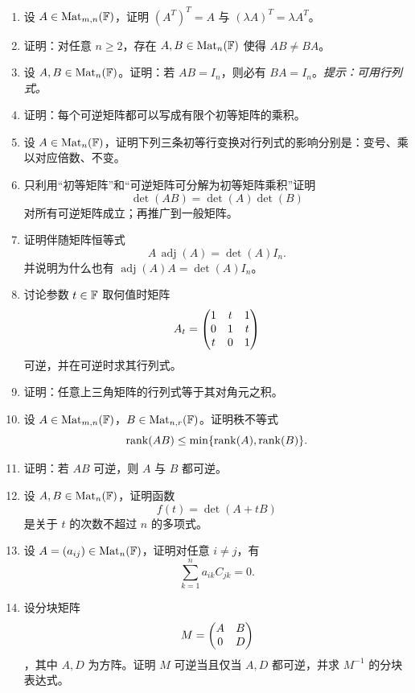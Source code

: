 \begin{enumerate}[label=\arabic*.,start=31]
  \item \medium 设 $A\in\mathrm{Mat}_{m,n}(\mathbb{F})$，证明 $(A^T)^T=A$ 与 $(\lambda A)^T=\lambda A^T$。

  \item \medium 证明：对任意 $n\ge2$，存在 $A,B\in\mathrm{Mat}_n(\mathbb{F})$ 使得 $AB\ne BA$。

  \item \medium 设 $A,B\in\mathrm{Mat}_n(\mathbb{F})$。证明：若 $AB=I_n$，则必有 $BA=I_n$。\emph{提示：可用行列式。}

  \item \medium 证明：每个可逆矩阵都可以写成有限个初等矩阵的乘积。

  \item \medium 设 $A\in\mathrm{Mat}_n(\mathbb{F})$，证明下列三条初等行变换对行列式的影响分别是：变号、乘以对应倍数、不变。

  \item \medium 只利用“初等矩阵”和“可逆矩阵可分解为初等矩阵乘积”证明
  \[
  \det(AB)=\det(A)\det(B)
  \]
  对所有可逆矩阵成立；再推广到一般矩阵。

  \item \medium 证明伴随矩阵恒等式
  \[
  A\,\operatorname{adj}(A)=\det(A)I_n.
  \]
  并说明为什么也有 $\operatorname{adj}(A)A=\det(A)I_n$。

  \item \medium 讨论参数 $t\in\mathbb{F}$ 取何值时矩阵
  \[
  A_t=\begin{pmatrix} 1&t&1\\0&1&t\\t&0&1 \end{pmatrix}
  \]
  可逆，并在可逆时求其行列式。

  \item \medium 证明：任意上三角矩阵的行列式等于其对角元之积。

  \item \medium 设 $A\in\mathrm{Mat}_{m,n}(\mathbb{F})$，$B\in\mathrm{Mat}_{n,r}(\mathbb{F})$。证明秩不等式
  \[
  \operatorname{rank}(AB)\le \min\{\operatorname{rank}(A),\operatorname{rank}(B)\}.
  \]

  \item \medium 证明：若 $AB$ 可逆，则 $A$ 与 $B$ 都可逆。

  \item \medium 设 $A,B\in\mathrm{Mat}_n(\mathbb{F})$，证明函数
  \[
  f(t)=\det(A+tB)
  \]
  是关于 $t$ 的次数不超过 $n$ 的多项式。

  \item \medium 设 $A=(a_{ij})\in\mathrm{Mat}_n(\mathbb{F})$，证明对任意 $i\ne j$，有
  \[
  \sum_{k=1}^n a_{ik}C_{jk}=0.
  \]

  \item \medium 设分块矩阵
  \[
  M=\begin{pmatrix} A&B\\0&D \end{pmatrix}
  \]
  ，其中 $A,D$ 为方阵。证明 $M$ 可逆当且仅当 $A,D$ 都可逆，并求 $M^{-1}$ 的分块表达式。


\end{enumerate}
